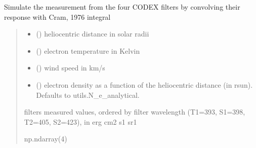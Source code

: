 \documentclass[letterpaper,10pt,english]{sphinxmanual}
\begin{document}
\begin{fulllineitems}
\label{\detokenize{doppler_dimming_lib:doppler_dimming_lib.codex.simulate_codex_measure}}
\pysigstartsignatures
{}
\pysigstopsignatures
\sphinxAtStartPar
Simulate the measurement from the four CODEX filters by convolving their response with Cram, 1976 integral
\begin{quote}\begin{description}
\begin{itemize}
\item {} 
\sphinxAtStartPar
{} () \textendash{} heliocentric distance in solar radii

\item {} 
\sphinxAtStartPar
{} () \textendash{} electron temperature in Kelvin

\item {} 
\sphinxAtStartPar
{} () \textendash{} wind speed in km/s

\item {} 
\sphinxAtStartPar
{} (\sphinxstyleliteralemphasis{\sphinxupquote{, }}) \textendash{} electron density as a function of the heliocentric distance (in rsun). Defaults to utils.N\_e\_analytical.

\end{itemize}

\sphinxAtStartPar
filters measured values, ordered by filter wavelength (T1=393, S1=398, T2=405, S2=423), in erg cm\sphinxhyphen{}2 s\sphinxhyphen{}1 sr\sphinxhyphen{}1

\sphinxAtStartPar
np.ndarray(4)

\end{description}\end{quote}

\end{fulllineitems}
\end{document}
